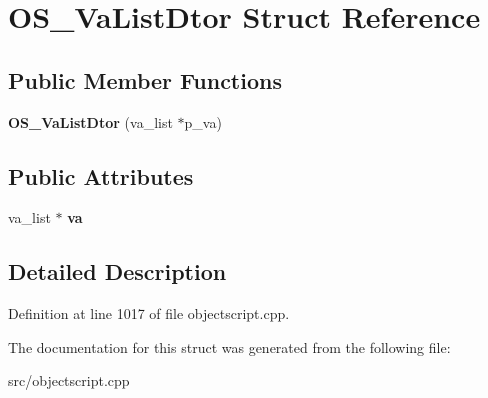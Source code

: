 \hypertarget{struct_o_s___va_list_dtor}{}\section{O\+S\+\_\+\+Va\+List\+Dtor Struct Reference}
\label{struct_o_s___va_list_dtor}
\subsection*{Public Member Functions}
\begin{DoxyCompactItemize}
\item 
{\bfseries O\+S\+\_\+\+Va\+List\+Dtor} (va\+\_\+list $\ast$p\+\_\+va)\hypertarget{struct_o_s___va_list_dtor_aeaf9d5f965188e94c7410a209f803f5a}{}\label{struct_o_s___va_list_dtor_aeaf9d5f965188e94c7410a209f803f5a}

\end{DoxyCompactItemize}
\subsection*{Public Attributes}
\begin{DoxyCompactItemize}
\item 
va\+\_\+list $\ast$ {\bfseries va}\hypertarget{struct_o_s___va_list_dtor_ab6a2620888146eb957e9b0ad78c4176f}{}\label{struct_o_s___va_list_dtor_ab6a2620888146eb957e9b0ad78c4176f}

\end{DoxyCompactItemize}


\subsection{Detailed Description}


Definition at line 1017 of file objectscript.\+cpp.



The documentation for this struct was generated from the following file\+:\begin{DoxyCompactItemize}
\item 
src/objectscript.\+cpp\end{DoxyCompactItemize}
